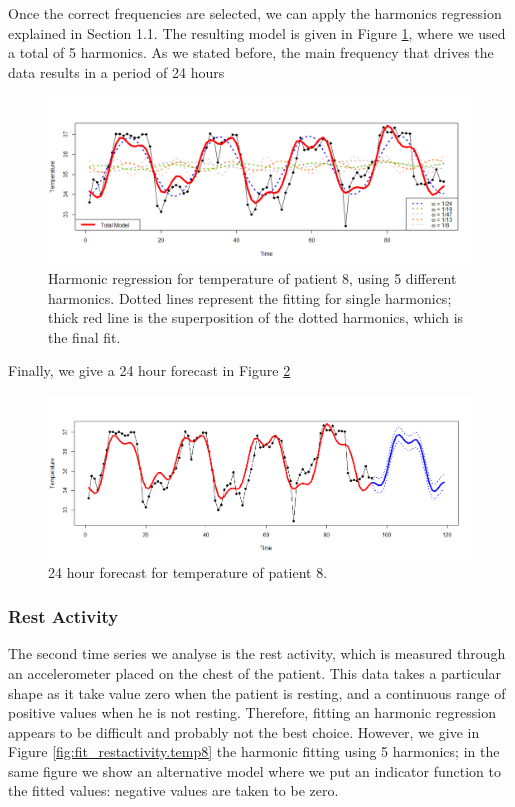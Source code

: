\documentclass[]{article}
\begin{document}
Once the correct frequencies are selected, we can apply the harmonics regression explained in Section 1.1. The resulting model is given in Figure \ref{fig:fitted.Temp8}, where we used a total of 5 harmonics. As we stated before, the main frequency that drives the data results in a period of 24 hours

\begin{figure}[htbp]\centering
	\includegraphics[scale = 0.37]{fitted_temp8.png}
	\caption{Harmonic regression for temperature of patient 8, using 5 different harmonics. Dotted lines represent the fitting for single harmonics; thick red line is the superposition of the dotted harmonics, which is the final fit.}
	\label{fig:fitted.Temp8}
\end{figure}

\vspace{1cm}
Finally, we give a 24 hour forecast in Figure \ref{fig:forecast.Temp8}

\begin{figure}[htbp]\centering
	\includegraphics[scale = 0.37]{forecasting_Temp8.png}
	\caption{24 hour forecast for temperature of patient 8.}
	\label{fig:forecast.Temp8}
\end{figure}



\subsubsection*{Rest Activity}
The second time series we analyse is the rest activity, which is measured through an accelerometer placed on the chest of the patient. This data takes a particular shape as it take value zero when the patient is resting, and a continuous range of positive values when he is not resting. Therefore, fitting an harmonic regression appears to be difficult and probably not the best choice. However, we give in  Figure \ref{fig:fit_restactivity.temp8} the harmonic fitting using 5 harmonics; in the same figure we show an alternative model where we put an indicator function to the fitted values: negative values are taken to be zero. 
\end{document}

